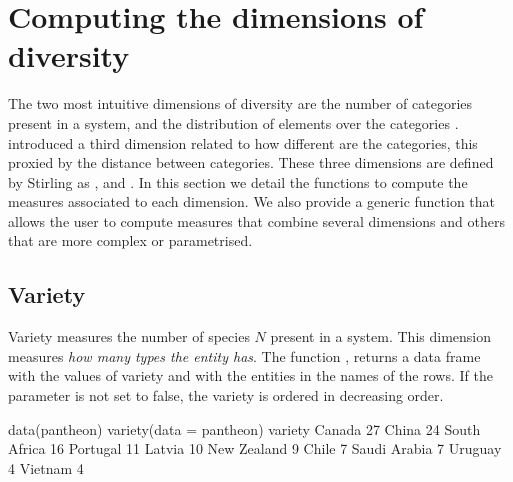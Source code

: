 


\section{Computing the dimensions of diversity}
The two most intuitive dimensions of diversity are the number of categories present in a system, and the distribution of elements over the categories \citep{mcdonald_conceptualization_2003}. 
\citet{stirling_general_2007} introduced a third dimension related to how different are the categories, this proxied by the distance between categories. 
These three dimensions are defined by Stirling as ,  and . 
In this section we detail the functions to compute the measures associated to each dimension. We also provide a generic function that allows the user to compute measures that combine several dimensions and others that are more complex or parametrised.

\subsection{Variety}
Variety measures the number of species $N$ present in a system. This dimension measures \emph{how many types the entity has}. The function , returns a data frame with the values of variety and with the entities in the names of the rows. If the parameter  is not set to false, the variety is ordered in decreasing order.


\begin{example}
data(pantheon)
variety(data = pantheon)
             variety
Canada            27
China             24
South Africa      16
Portugal          11
Latvia            10
New Zealand        9
Chile              7
Saudi Arabia       7
Uruguay            4
Vietnam            4

\end{example}

